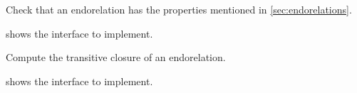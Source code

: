 

\begin{codeexercise}
    Check that an endorelation has the properties mentioned in \cref{sec:endorelations}.

     shows the interface to implement.
\end{codeexercise}




\begin{codeexercise}
    Compute the transitive closure of an endorelation.

     shows the interface to implement.
\end{codeexercise}





